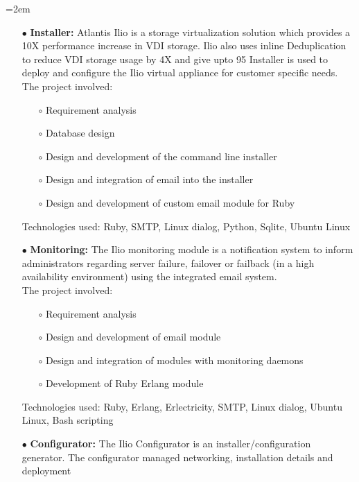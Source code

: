 \documentclass{scrartcl}
\newcommand{\MarginDate}[1]{\marginpar{\raggedleft\itshape\small#1}}
\newcommand{\Description}[1]{\hangindent=2em\hangafter=0\noindent\raggedright\footnotesize{#1}\par\normalsize}
\begin{document}
\begin{cv}{
\href{http://www.develmj.com}{}
}
\vspace{0.5em}

\Description{
\begin{itemize}
\item[\footnotesize$\bullet$] \textbf{Installer: } \MarginDate{Atlantis Ilio}Atlantis Ilio is a storage virtualization solution which provides a
  10X performance increase in VDI storage. Ilio also uses inline Deduplication
  to reduce VDI storage usage by 4X and give upto 95%
  Installer is used to deploy and configure the Ilio virtual appliance for
  customer specific needs.\\
  The project involved:
  \begin{itemize}
  \item[\footnotesize$\circ$] Requirement analysis
  \item[\footnotesize$\circ$] Database design
  \item[\footnotesize$\circ$] Design and development of the command line installer
  \item[\footnotesize$\circ$] Design and integration of email into the installer
  \item[\footnotesize$\circ$] Design and development of custom email
    module for Ruby
  \end{itemize}
  Technologies used: Ruby, SMTP, Linux dialog, Python, Sqlite, Ubuntu Linux
\item[\footnotesize$\bullet$] \textbf{Monitoring: } The Ilio monitoring module is a notification system to inform
administrators regarding server failure, failover or failback (in a high
availability environment) using the integrated email system.\\
The project involved:
  \begin{itemize}
  \item[\footnotesize$\circ$] Requirement analysis
  \item[\footnotesize$\circ$] Design and development of email module
  \item[\footnotesize$\circ$] Design and integration of modules with monitoring daemons
  \item[\footnotesize$\circ$] Development of Ruby Erlang module
  \end{itemize}
  Technologies used: Ruby, Erlang, Erlectricity, SMTP, Linux dialog, Ubuntu
  Linux, Bash scripting
\item[\footnotesize$\bullet$] \textbf{Configurator: } The Ilio Configurator is an installer/configuration generator.
    The configurator managed networking, installation details and deployment

\end{itemize}}
\end{cv}
\end{document}
